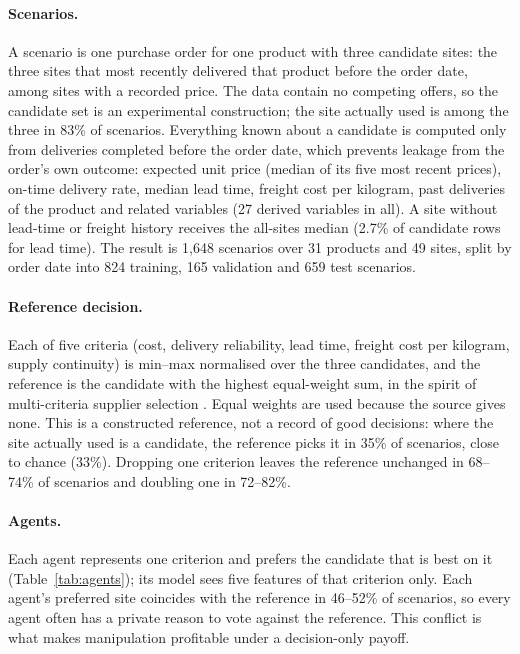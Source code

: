\documentclass[pdflatex,sn-basic]{sn-jnl}
\begin{document}
\paragraph{Scenarios.} A scenario is one purchase order for one product with three candidate
sites: the three sites that most recently delivered that product before the order date, among
sites with a recorded price. The data contain no competing offers, so the candidate set is an
experimental construction; the site actually used is among the three in 83\% of scenarios.
Everything known about a candidate is computed only from deliveries completed before the
order date, which prevents leakage from the order's own outcome: expected unit price (median
of its five most recent prices), on-time delivery rate, median lead time, freight cost per
kilogram, past deliveries of the product and related variables (27 derived variables in all).
A site without lead-time or freight history receives the all-sites median (2.7\% of candidate
rows for lead time). The result is 1{,}648 scenarios over 31 products and 49 sites, split by
order date into 824 training, 165 validation and 659 test scenarios.

\paragraph{Reference decision.} Each of five criteria (cost, delivery reliability, lead time,
freight cost per kilogram, supply continuity) is min--max normalised over the three
candidates, and the reference is the candidate with the highest equal-weight sum, in the
spirit of multi-criteria supplier selection \citep{forghani2018}. Equal weights are used
because the source gives none. This is a constructed reference, not a record of good
decisions: where the site actually used is a candidate, the reference picks it in 35\% of
scenarios, close to chance (33\%). Dropping one criterion leaves the reference unchanged in
68--74\% of scenarios and doubling one in 72--82\%.

\paragraph{Agents.} Each agent represents one criterion and prefers the candidate that is
best on it (Table~\ref{tab:agents}); its model sees five features of that criterion only. Each
agent's preferred site coincides with the reference in 46--52\% of scenarios, so every agent
often has a private reason to vote against the reference. This conflict is what makes
manipulation profitable under a decision-only payoff.
\end{document}
